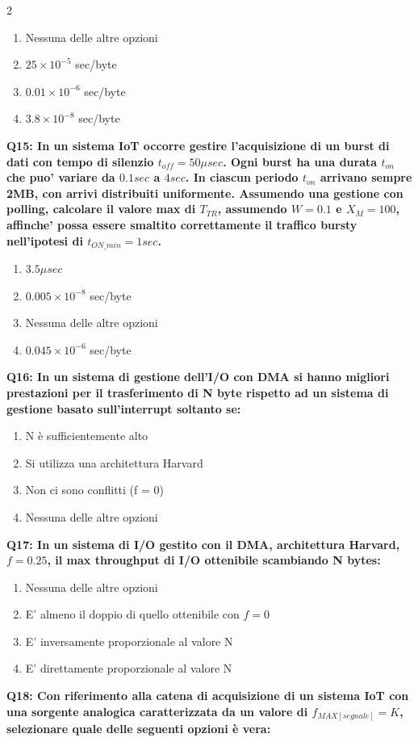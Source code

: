\documentclass[10pt]{article}
\begin{document}
\begin{multicols}{2}
\begin{enumerate}[label=\arabic*.]
\item Nessuna delle altre opzioni
\item $25\times10^{-5}$ sec/byte
\item $0.01\times10^{-6}$ sec/byte
\item $3.8\times10^{-8}$ sec/byte
\end{enumerate}
\textbf{Q15: In un sistema IoT occorre gestire l'acquisizione di un burst di dati con tempo di silenzio $t_{off}=50 \mu sec$. Ogni burst ha una durata $t_{on}$ che puo' variare da $0.1 sec$ a $4 sec$. In ciascun periodo $t_{on}$ arrivano sempre 2MB, con arrivi distribuiti uniformente. Assumendo una gestione con polling, calcolare il valore max di $T_{TR}$, assumendo $W=0.1$ e $X_M = 100$, affinche' possa essere smaltito correttamente il traffico bursty nell'ipotesi di $t_{ON\_min}=1 sec$.}

\begin{enumerate}[label=\arabic*.]
\item $3.5 \mu sec$
\item $0.005\times10^{-8}$ sec/byte
\item Nessuna delle altre opzioni
\item $0.045\times10^{-6}$ sec/byte
\end{enumerate}
\textbf{Q16: In un sistema di gestione dell’I/O con DMA si hanno migliori prestazioni per il trasferimento di N byte rispetto ad un sistema di gestione basato sull’interrupt soltanto se:}

\begin{enumerate}[label=\arabic*.]
\item N è sufficientemente alto
\item Si utilizza una architettura Harvard
\item Non ci sono conflitti (f = 0)
\item Nessuna delle altre opzioni
\end{enumerate}
\textbf{Q17: In un sistema di I/O gestito con il DMA, architettura Harvard, $f=0.25$, il max throughput di I/O ottenibile scambiando N bytes:}

\begin{enumerate}[label=\arabic*.]
\item Nessuna delle altre opzioni
\item E' almeno il doppio di quello ottenibile con $f=0$
\item E' inversamente proporzionale al valore N
\item E' direttamente proporzionale al valore N
\end{enumerate}
\textbf{Q18: Con riferimento alla catena di acquisizione di un sistema IoT con una sorgente analogica caratterizzata da un valore di $f_{MAX[segnale]} = K$, selezionare quale delle seguenti opzioni è vera:}


\end{multicols}
\end{document}
